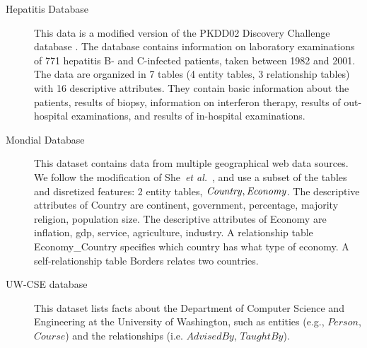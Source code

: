 \documentclass[twoside,11pt]{article}
\newcommand{\etal}{\textit{et al.}}
\begin{document}
\begin{description}
\item[Hepatitis Database] This data is a modified version of the PKDD02 Discovery Challenge database \cite{Frank2007}. %
The database contains information on laboratory examinations of 771 hepatitis B- and C-infected patients, taken
between 1982 and 2001. The data are organized in 7 tables (4 entity tables,  3 relationship tables) with 16 descriptive attributes. They contain basic information about the patients, results of biopsy, information on interferon therapy, results of out-hospital examinations, and results of in-hospital examinations. 

\item[Mondial Database] 
%
%
This dataset contains data from multiple geographical web data sources. 
We follow the modification of She~\etal~\cite{wangMondial}, and use a subset of the tables and disretized features: 2 entity tables, $\it{Country},\it{Economy}$. The descriptive attributes of Country are continent, government, percentage, majority religion, population size. The descriptive attributes of Economy are inflation, gdp, service, agriculture, industry. A relationship table Economy\_Country specifies which country has what type of economy. A self-relationship table Borders relates two countries.



\item[UW-CSE database] This dataset lists facts about the Department of Computer Science and Engineering at the University of Washington, such as entities (e.g., $Person$, $Course$) and the relationships (i.e. $AdvisedBy$, $TaughtBy$).

\end{description}
\end{document}
